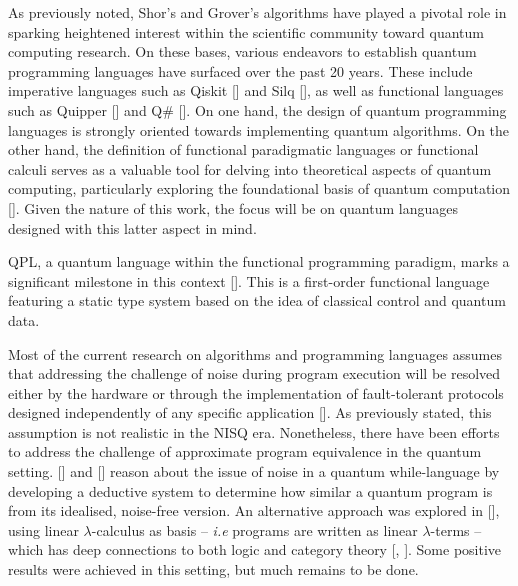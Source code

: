 As previously noted, Shor's and Grover's algorithms have played a pivotal role in sparking heightened interest within the scientific community toward quantum computing research. On these bases, various endeavors to establish quantum programming languages have surfaced over the past 20 years.  These include imperative languages such as Qiskit [\cite{Qiskit}] and Silq [\cite{bichsel2020silq}], as well as functional languages such as Quipper [\cite{green2013quipper}] and Q\# [\cite{svore2018q}]. On one hand, the design of quantum programming languages is strongly oriented towards implementing quantum algorithms. On the other hand, the  definition of functional paradigmatic languages or functional calculi serves as a valuable tool for delving into theoretical aspects of quantum computing, particularly exploring the foundational basis of quantum computation [\cite{zorzi2016quantum}]. Given the nature of this work, the focus will be on quantum languages designed with this latter aspect in mind. 


QPL, a quantum language within the functional programming paradigm, marks a significant milestone in this context [\cite{selinger2004towards}]. This is a first-order functional language featuring a static type system based on the idea of classical control and quantum data.

Most of the current research on algorithms and programming languages assumes that addressing the challenge of noise during program execution will be resolved either by the hardware or through the implementation of fault-tolerant protocols designed independently of any specific application [\cite{chong2017programming}]. As previously stated, this assumption is not realistic in the NISQ era. Nonetheless, there have been efforts to address the challenge of approximate program equivalence in the quantum setting. [\cite{hung2019quantitative}] and [\cite{tao2021gleipnir}] reason about the issue of noise in a quantum while-language by developing a deductive system to determine how similar a quantum program is from its idealised, noise-free version. An alternative approach was explored in [\cite{dahlqvist2022syntactic}], using linear $\lambda$-calculus as basis – \textit{i.e} programs are written as linear $\lambda$-terms – which has deep connections to both logic and category theory [\cite{girard1995advances}, \cite{benton1994mixed}]. Some positive results were achieved in this setting, but much remains to be done.

